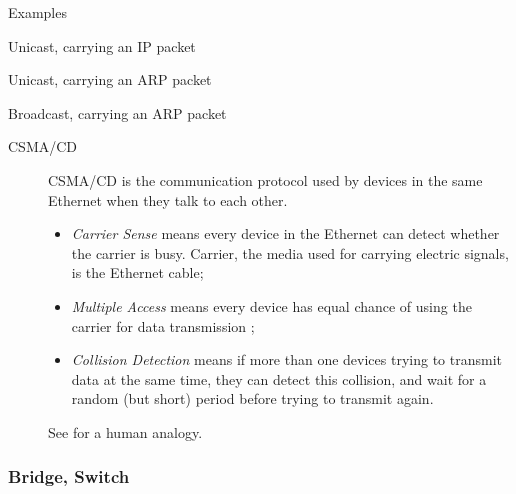 \begin{frame}{Examples}
  \begin{iblock}{Unicast, carrying an IP packet}
    \centering
    \mode<beamer>{\texttt{[image: ethframe3]}}%
  \end{iblock}
  \begin{iblock}{Unicast, carrying an ARP packet}
    \centering
    \mode<beamer>{\texttt{[image: ethframe2]}}%
  \end{iblock}
  \begin{iblock}{Broadcast, carrying an ARP packet}
    \centering
    \mode<beamer>{\texttt{[image: ethframe]}}%
  \end{iblock}
\end{frame}

\begin{description}
\item[CSMA/CD] CSMA/CD is the communication protocol used by devices in the same Ethernet
  when they talk to each other.
  \begin{itemize}
  \item \emph{Carrier Sense} means every device in the Ethernet can detect whether the
    carrier is busy. Carrier, the media used for carrying electric signals, is the Ethernet cable;
  \item \emph{Multiple Access} means every device has equal chance of using the carrier
    for data transmission ;
  \item \emph{Collision Detection} means if more than one devices trying to transmit
    data at the same time, they can detect this collision, and wait for a random (but
    short) period before trying to transmit again.
  \end{itemize}
  See  for a human analogy.
\end{description}

\subsubsection{Bridge, Switch}

